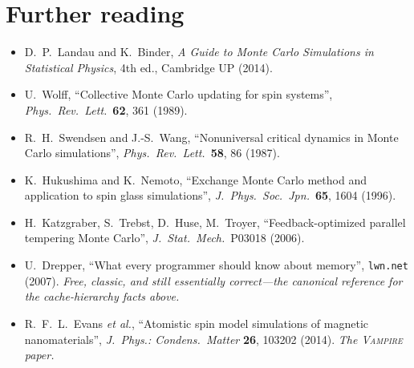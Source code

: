 \documentclass[11pt,letterpaper]{article}
\begin{document}
\section{Further reading}
\begin{itemize}[noitemsep]
  \item D.~P.~Landau and K.~Binder, \emph{A Guide to Monte Carlo Simulations
        in Statistical Physics}, 4th ed., Cambridge UP (2014).
  \item U.~Wolff, ``Collective Monte Carlo updating for spin systems'',
        \emph{Phys.\ Rev.\ Lett.}\ \textbf{62}, 361 (1989).
  \item R.~H.~Swendsen and J.-S.~Wang, ``Nonuniversal critical dynamics
        in Monte Carlo simulations'', \emph{Phys.\ Rev.\ Lett.}\
        \textbf{58}, 86 (1987).
  \item K.~Hukushima and K.~Nemoto, ``Exchange Monte Carlo method and
        application to spin glass simulations'',
        \emph{J.~Phys.\ Soc.\ Jpn.}\ \textbf{65}, 1604 (1996).
  \item H.~Katzgraber, S.~Trebst, D.~Huse, M.~Troyer, ``Feedback-optimized
        parallel tempering Monte Carlo'', \emph{J.\ Stat.\ Mech.}\
        P03018 (2006).
  \item U.~Drepper, ``What every programmer should know about memory'',
        \texttt{lwn.net} (2007). \emph{Free, classic, and
        still essentially correct---the canonical reference for the
        cache-hierarchy facts above.}
  \item R.~F.~L.~Evans \emph{et al.}, ``Atomistic spin model simulations of
        magnetic nanomaterials'', \emph{J.~Phys.: Condens.\ Matter}
        \textbf{26}, 103202 (2014). \emph{The \textsc{Vampire} paper.}
\end{itemize}
\end{document}
